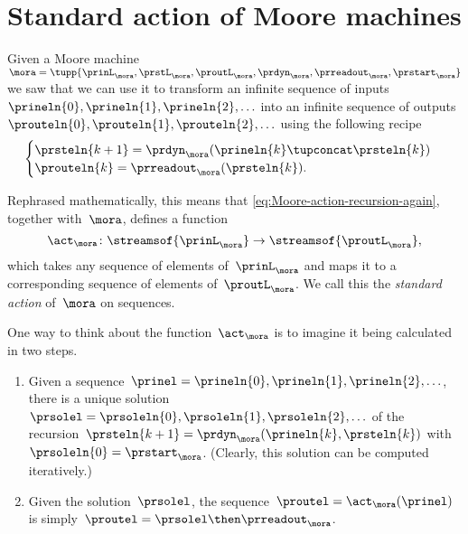 
\section{Standard action of Moore machines}
\label{sec:Moore-acting-on-sequences}

Given a Moore machine~$\mora = \tupp{\prinL_\mora,\prstL_\mora,\proutL_\mora,\prdyn_\mora,\prreadout_\mora,\prstart_\mora}$
we saw that we can use it to transform an infinite sequence of inputs~$\prineln{0}, \prineln{1}, \prineln{2}, \ldots$ into an infinite sequence of outputs~$\prouteln{0}, \prouteln{1}, \prouteln{2}, \ldots$ using the following recipe
\begin{equation}
    \label{eq:Moore-action-recursion-again}
    \begin{cases}
        \prsteln{k+1} = \prdyn_\mora(\prineln{k} \tupconcat \prsteln{k}) \\
        \prouteln{k}   = \prreadout_\mora(\prsteln{k}).
    \end{cases}
\end{equation}

Rephrased mathematically, this means that \cref{eq:Moore-action-recursion-again}, together with~$\mora$, defines a function
\begin{equation}
    \act_{\mora} \colon \streamsof{\prinL_\mora}  \to \streamsof{\proutL_\mora},
\end{equation}
which takes any sequence of elements of~$\prinL_\mora$ and maps it to a corresponding sequence of elements of~$\proutL_\mora$.
We call this the \emph{standard action} of~$\mora$ on sequences.

\begin{remark}
    \label{re:moore-action-two-steps}
    One way to think about the function~$\act_{\mora}$ is to imagine it being calculated in two steps.
    \begin{enumerate}
        \item Given a sequence~$\prinel = \prineln{0}, \prineln{1}, \prineln{2}, \ldots$, there is a unique solution~$\prsolel = \prsoleln{0}, \prsoleln{1}, \prsoleln{2}, \ldots$ of the recursion~$\prsteln{k+1} = \prdyn_\mora(\prineln{k}, \prsteln{k})$ with~$\prsoleln{0} = \prstart_\mora$.
              (Clearly, this solution can be computed iteratively.)
        \item Given the solution~$\prsolel$, the sequence~$\proutel = \act_{\mora}(\prinel)$ is simply~$\proutel = \prsolel \then \prreadout_\mora$.
    \end{enumerate}
\end{remark}

